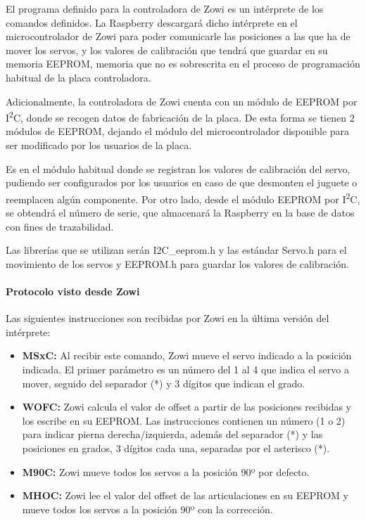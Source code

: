 El programa definido para la controladora de Zowi es un intérprete de los comandos definidos. La Raspberry descargará dicho intérprete en el microcontrolador de Zowi para poder comunicarle las posiciones a las que ha de mover los servos, y los valores de calibración que tendrá que guardar en su memoria EEPROM, memoria que no es sobrescrita en el proceso de programación habitual de la placa controladora.

Adicionalmente, la controladora de Zowi cuenta con un módulo de EEPROM por  I\textsuperscript{2}C, donde se recogen datos de fabricación de la placa. De esta forma se tienen 2 módulos de EEPROM, dejando el módulo del microcontrolador disponible para ser modificado por los usuarios de la placa.

Es en el módulo habitual donde se registran los valores de calibración del servo, pudiendo ser configurados por los usuarios en caso de que desmonten el juguete o reemplacen algún componente. Por otro lado, desde el módulo EEPROM por  I\textsuperscript{2}C, se obtendrá el número de serie, que almacenará la Raspberry en la base de datos con fines de trazabilidad.

Las librerías que se utilizan serán I2C\_eeprom.h y las estándar Servo.h para el movimiento de los servos y EEPROM.h para guardar los valores de calibración.

\paragraph{Protocolo visto desde Zowi}

Las siguientes instrucciones son recibidas por Zowi en la última versión del intérprete:

\begin{itemize}
  \item \textbf{MSxC:} Al recibir este comando, Zowi mueve el servo indicado a la posición indicada. El primer parámetro es un número del 1 al 4 que indica el servo a mover, seguido del separador (*) y 3 dígitos que indican el grado.
  \item \textbf{WOFC:} Zowi calcula el valor de offset a partir de las posiciones recibidas y los escribe en su EEPROM. Las instrucciones contienen un número (1 o 2) para indicar pierna derecha/izquierda, además del separador (*) y las posiciones en grados, 3 dígitos cada una, separadas por el asterisco (*).
  \item \textbf{M90C:} Zowi mueve todos los servos a la posición 90º por defecto.
  \item \textbf{MHOC:} Zowi lee el valor del offset de las articulaciones en su EEPROM y mueve todos los servos a la posición 90º con la corrección.
\end{itemize}

